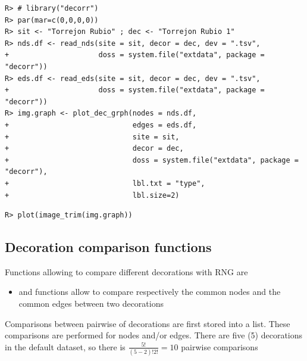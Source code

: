 \documentclass[article]{jss}\usepackage{knitr}
\begin{document}
\begin{kframe}
\begin{verbatim}
R> # library("decorr")
R> par(mar=c(0,0,0,0))
R> sit <- "Torrejon Rubio" ; dec <- "Torrejon Rubio 1"
R> nds.df <- read_nds(site = sit, decor = dec, dev = ".tsv",
+                     doss = system.file("extdata", package = "decorr"))
R> eds.df <- read_eds(site = sit, decor = dec, dev = ".tsv",
+                     doss = system.file("extdata", package = "decorr"))
R> img.graph <- plot_dec_grph(nodes = nds.df,
+                             edges = eds.df,
+                             site = sit,
+                             decor = dec,
+                             doss = system.file("extdata", package = "decorr"),
+                             lbl.txt = "type",
+                             lbl.size=2)
\end{verbatim}


{\ttfamily\noindent\bfseries{}}\begin{verbatim}
R> plot(image_trim(img.graph))
\end{verbatim}


{\ttfamily\noindent\bfseries\color{errorcolor}{\#\# Error in assert\_image(image): object 'img.graph' not found}}\end{kframe}

\subsection{Decoration comparison functions} \label{sec:functions_one}

Functions allowing to compare different decorations with RNG are

\begin{itemize}
\setlength\itemsep{.1em}
  \item {} and  functions allow to compare respectively the common nodes and the common edges between two decorations
\end{itemize}

Comparisons between pairwise of decorations are first stored into a list. These comparisons are performed for nodes and/or edges. There are five (5) decorations in the default dataset, so there is $\frac{5!}{(5-2)!2!}={10}$ pairwise comparisons
\end{document}
